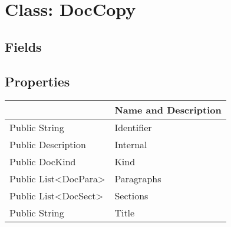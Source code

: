 \documentclass[11pt, oneside, a4paper]{book}
\begin{document}
\hypertarget{SoftwareEngineeringTools.{}Documentation.{}DocCopy}{}
\section{Class: DocCopy}

\subsection{Fields}

\subsection{Properties}
\begin{center}
\begin{tabular}{| p{3cm} | p{12cm} | }
\hline
\textbf{ } & \textbf{ Name and Description}\\
\hline
 Public  String &  Identifier\hypertarget{SoftwareEngineeringTools.{}Documentation.{}DocCopy.{}Identifier}{}\\
\hline
 Public  Description &  Internal\hypertarget{SoftwareEngineeringTools.{}Documentation.{}DocCopy.{}Internal}{}\\
\hline
 Public  DocKind &  Kind\hypertarget{SoftwareEngineeringTools.{}Documentation.{}DocCopy.{}Kind}{}\\
\hline
 Public  List<DocPara> &  Paragraphs\hypertarget{SoftwareEngineeringTools.{}Documentation.{}DocCopy.{}Paragraphs}{}\\
\hline
 Public  List<DocSect> &  Sections\hypertarget{SoftwareEngineeringTools.{}Documentation.{}DocCopy.{}Sections}{}\\
\hline
 Public  String &  Title\hypertarget{SoftwareEngineeringTools.{}Documentation.{}DocCopy.{}Title}{}\\
\hline
\end{tabular}
\end{center}
\end{document}
